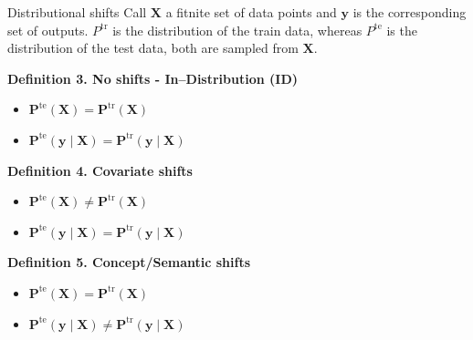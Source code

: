 \begin{frame}{Distributional shifts}
    Call $\mathbf X$ a fitnite set of data points and $\mathbf y$ is the corresponding set of outputs.
    $P^{\text{tr}}$ is the distribution of the train data, whereas $P^{\text{te}}$ is the distribution of the test data, both are sampled from $\mathbf X$.
    \medskip

    \textbf{Definition 3. No shifts - In–Distribution (ID)} \cite{tamang2025handlingoutofdistributiondatasurvey} \label{def3} \\
    \begin{itemize}
    \item $\mathbf P^{\text{te}}(\mathbf X) = \mathbf P^{\text{tr}}(\mathbf X)$
    \item $\mathbf P^{\text{te}}(\mathbf y \mid \mathbf X) = \mathbf P^{\text{tr}}(\mathbf y \mid \mathbf X)$
    \end{itemize}
    \medskip

    \textbf{Definition 4. Covariate shifts} \cite{MORENOTORRES2012521} \label{def4} \\
    \begin{itemize}
    \item $\mathbf P^{\text{te}}(\mathbf X) \neq \mathbf P^{\text{tr}}(\mathbf X)$
    \item $\mathbf P^{\text{te}}(\mathbf y \mid \mathbf X) = \mathbf P^{\text{tr}}(\mathbf y \mid \mathbf X)$
    \end{itemize}
    \medskip

    \textbf{Definition 5. Concept/Semantic shifts} \cite{MORENOTORRES2012521} \label{def5} \\
    \begin{itemize}
    \item $\mathbf P^{\text{te}}(\mathbf X) = \mathbf P^{\text{tr}}(\mathbf X)$
    \item $\mathbf P^{\text{te}}(\mathbf y \mid \mathbf X) \neq \mathbf P^{\text{tr}}(\mathbf y \mid \mathbf X)$
    \end{itemize}
\end{frame}